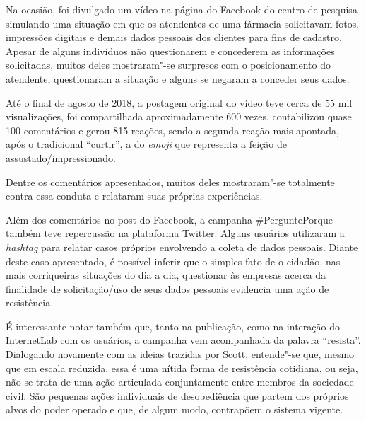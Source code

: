 Na ocasião, foi divulgado um vídeo na página do Facebook do centro de
pesquisa simulando uma situação em que os atendentes de uma fármacia
solicitavam fotos, impressões digitais e demais dados pessoais dos
clientes para fins de cadastro. Apesar de alguns indivíduos não
questionarem e concederem as informações solicitadas, muitos deles
mostraram"-se surpresos com o posicionamento do atendente, questionaram a
situação e alguns se negaram a conceder seus dados.


Até o final de agosto de 2018, a postagem original do vídeo teve cerca
de 55 mil visualizações, foi compartilhada aproximadamente 600 vezes,
contabilizou quase 100 comentários e gerou 815 reações, sendo a segunda
reação mais apontada, após o tradicional ``curtir'', a do \emph{emoji}
que representa a feição de assustado/impressionado.

Dentre os comentários apresentados, muitos deles mostraram"-se totalmente
contra essa conduta e relataram suas próprias experiências. 




Além dos comentários no post do Facebook, a campanha \#PerguntePorque
também teve repercussão na plataforma Twitter. Alguns usuários
utilizaram a \emph{hashtag} para relatar casos próprios envolvendo a
coleta de dados pessoais. Diante deste caso apresentado, é possível
inferir que o simples fato de o cidadão, nas mais corriqueiras situações
do dia a dia, questionar às empresas acerca da finalidade de
solicitação/uso de seus dados pessoais evidencia uma ação de
resistência.

É interessante notar também que, tanto na publicação, como na interação
do InternetLab com os usuários, a campanha vem acompanhada da palavra
``resista''. Dialogando novamente com as ideias trazidas por Scott,
entende"-se que, mesmo que em escala reduzida, essa é uma nítida forma de
resistência cotidiana, ou seja, não se trata de uma ação articulada
conjuntamente entre membros da sociedade civil. São pequenas ações
individuais de desobediência que partem dos próprios alvos do poder
operado e que, de algum modo, contrapõem o sistema vigente.

